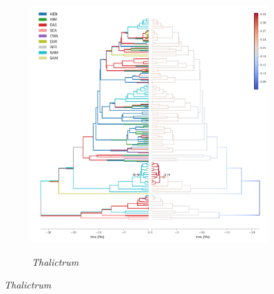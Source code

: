 \begin{figure}
  \ContinuedFloat
\begin{subfigure}{\textwidth}
\centering
\includegraphics[width=.99\linewidth]{figures/Thalictrum-supfig.pdf}
\label{fig:allium}
\caption{\textit{Thalictrum}}
\end{subfigure}
\end{figure}

